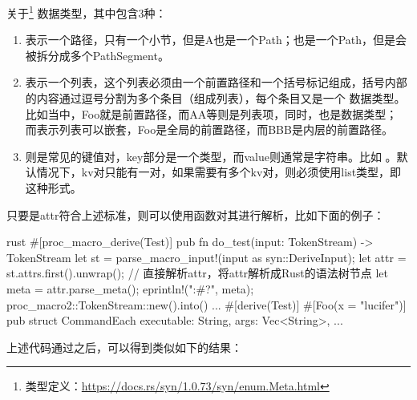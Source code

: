 关于\footnote{类型定义：\url{https://docs.rs/syn/1.0.73/syn/enum.Meta.html}}
数据类型，其中包含3种：
\begin{enumerate}
  \item {}表示一个路径，只有一个小节，但是A也是一个Path；也是一个Path，但是会被拆分成多个PathSegment。
  \item {}表示一个列表，这个列表必须由一个前置路径和一个括号标记组成，括号内部的内容通过逗号分割为多个条目（组成列表），每个条目又是一个
数据类型。比如当中，Foo就是前置路径，而AA等则是列表项，同时，也是数据类型；
而表示列表可以嵌套，Foo是全局的前置路径，而BBB是内层的前置路径。
  \item {}则是常见的键值对，key部分是一个类型，而value则通常是字符串。比如
。默认情况下，kv对只能有一对，如果需要有多个kv对，则必须使用list类型，即这种形式。
\end{enumerate}
只要是attr符合上述标准，则可以使用函数对其进行解析，比如下面的例子：
\begin{code-block}{rust}
#[proc_macro_derive(Test)]
pub fn do_test(input: TokenStream) -> TokenStream {
    let st = parse_macro_input!(input as syn::DeriveInput);
    let attr = st.attrs.first().unwrap();
    // 直接解析attr，将attr解析成Rust的语法树节点
    let meta = attr.parse_meta();
    eprintln!("{:#?}", meta);
    proc_macro2::TokenStream::new().into()
}
...
#[derive(Test)]
#[Foo(x = "lucifer")]
pub struct CommandEach {
    executable: String,
    args: Vec<String>,
...
}
\end{code-block}
上述代码通过之后，可以得到类似如下的结果：
